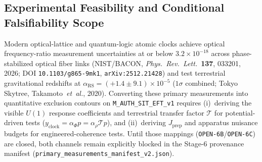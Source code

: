 \subsection{Experimental Feasibility and Conditional Falsifiability Scope}

Modern optical-lattice and quantum-logic atomic clocks achieve optical frequency-ratio measurement uncertainties at or below $3.2\times 10^{-18}$ across phase-stabilized optical fiber links (NIST/BACON, \emph{Phys.\ Rev.\ Lett.}\ \textbf{137}, 033201, 2026; DOI \texttt{10.1103/g865-9mk1}, \texttt{arXiv:2512.21428}) and test terrestrial gravitational redshifts at $\alpha_{\mathrm{RS}} = (+1.4 \pm 9.1)\times 10^{-5}$ ($1\sigma$ combined; Tokyo Skytree, Takamoto~\emph{et~al.}, 2020). Converting these primary measurements into quantitative exclusion contours on \texttt{M\_AUTH\_SIT\_EFT\_v1} requires (i)~deriving the visible $U(1)$ response coefficients and terrestrial transfer factor $\mathcal{T}$ for potential-driven tests ($y_{\mathrm{clock}} = \alpha_\Phi p = \alpha_\rho\mathcal{T} p$), and (ii)~deriving $J_{\mathrm{prep}}$ and apparatus nuisance budgets for engineered-coherence tests. Until those mappings (\texttt{OPEN-6B}/\texttt{OPEN-6C}) are closed, both channels remain explicitly blocked in the Stage-6 provenance manifest (\texttt{primary\_measurements\_manifest\_v2.json}).

